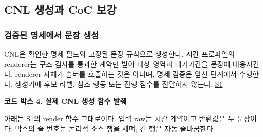 \documentclass[10pt,a4paper,twocolumn]{article}\usepackage[margin=18mm]{geometry}\usepackage{fontspec,kotex}
\begin{document}
\subsection{CNL 생성과 CoC 보강}

\subsubsection{검증된 명세에서 문장 생성}

CNL은 확인한 명세 필드와 고정된 문장 규칙으로 생성한다. 시간 프로파일의 renderer는 구조 검사를 통과한 계약만 받아 대상 영역과 대기기간을 문장에 대응시킨다. renderer 자체가 솔버를 호출하는 것은 아니며, 명세 검증은 앞선 단계에서 수행한다. 생성기에 후보 라벨, 참조 행동 또는 진행 점수를 전달하지 않는다. \href{\detokenize{/home/jinhyun/prj_ws/prj_jin/guardsynth-cc/projects/04-guardsynth-coc/experiments/paper1_cnl_learning/temporal_preservation.py}}{S1}\par

\textbf{코드 박스 4. 실제 CNL 생성 함수 발췌}\par

아래는 S1의 {\ttfamily{}\selectfont\footnotesize render} 함수 그대로이다. 입력 raw는 시간 계약이고 반환값은 두 문장이다. 박스의 줄 번호는 논리적 소스 행을 세며, 긴 행은 자동 줄바꿈한다.\par
\end{document}
